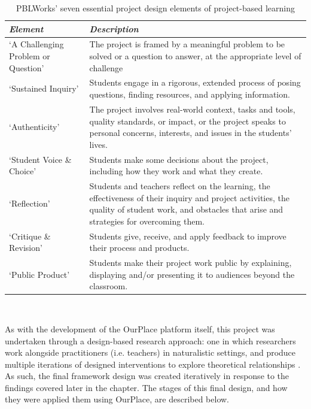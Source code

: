 \begin{table}[]
    \centering
    \begin{tabularx}{\textwidth}{p{40mm}|X}
\small\textit{Element} 
    & \small\textit{Description}\\
\hline
\footnotesize `A Challenging Problem or Question'
    & \footnotesize The project is framed by a meaningful problem to be solved or a question to answer, at the appropriate level of challenge\\
\hline
    \footnotesize `Sustained Inquiry' 
    & \footnotesize Students engage in a rigorous, extended process of posing questions, finding resources, and applying information. \\
\hline
    \footnotesize `Authenticity' 
    & \footnotesize The project involves real-world context, tasks and tools, quality standards, or impact, or the project speaks to personal concerns, interests, and issues in the students' lives. \\
\hline
    \footnotesize `Student Voice \& Choice' 
    & \footnotesize Students make some decisions about the project, including how they work and what they create. \\
\hline
    \footnotesize `Reflection' 
    & \footnotesize Students and teachers reflect on the learning, the effectiveness of their inquiry and project activities, the quality of student work, and obstacles that arise and strategies for overcoming them. \\
\hline
    \footnotesize `Critique \& Revision' 
    & \footnotesize Students give, receive, and apply feedback to improve their process and products. \\
\hline
    \footnotesize `Public Product' 
    & \footnotesize Students make their project work public by explaining, displaying and/or presenting it to audiences beyond the classroom. \\
\end{tabularx}
    \caption[The `Seven Essential Project Design Elements' of Project-Based Learning]{PBLWorks' seven essential project design elements of project-based learning \citep{Larmer2015}}~\label{tab:PBLElements}
\end{table}

As with the development of the OurPlace platform itself, this project was undertaken through a design-based research approach: one in which researchers work alongside practitioners (i.e. teachers) in naturalistic settings, and produce multiple iterations of designed interventions to explore theoretical relationships \citep{Barab2004}. As such, the final framework design was created iteratively in response to the findings covered later in the chapter. The stages of this final design, and how they were applied them using OurPlace, are described below.

